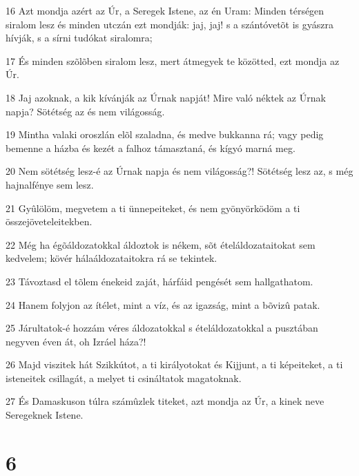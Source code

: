 \par 16 Azt mondja azért az Úr, a Seregek Istene, az én Uram: Minden térségen siralom lesz és minden utczán ezt mondják: jaj, jaj! s a szántóvetõt is gyászra hívják, s a sírni tudókat siralomra;
\par 17 És minden szõlõben siralom lesz, mert átmegyek te közötted, ezt mondja az Úr.
\par 18 Jaj azoknak, a kik kívánják az Úrnak napját! Mire való néktek az Úrnak napja? Sötétség az  és nem világosság.
\par 19 Mintha valaki oroszlán elõl szaladna, és medve bukkanna rá; vagy pedig bemenne a házba és kezét a falhoz támasztaná, és kígyó marná meg.
\par 20 Nem sötétség lesz-é az Úrnak napja és nem világosság?! Sötétség lesz az, s még hajnalfénye sem lesz.
\par 21 Gyûlölöm, megvetem a ti ünnepeiteket, és nem gyönyörködöm a ti összejöveteleitekben.
\par 22 Még ha égõáldozatokkal áldoztok is nékem, sõt ételáldozataitokat sem kedvelem; kövér hálaáldozataitokra rá se tekintek.
\par 23 Távoztasd el tõlem énekeid zaját, hárfáid pengését sem hallgathatom.
\par 24 Hanem folyjon az ítélet, mint a víz, és az igazság, mint a bõvizû patak.
\par 25 Járultatok-é hozzám véres áldozatokkal s ételáldozatokkal a pusztában negyven éven át, oh Izráel háza?!
\par 26 Majd viszitek hát Szikkútot, a ti királyotokat és Kijjunt, a ti képeiteket, a ti isteneitek csillagát, a melyet ti csináltatok magatoknak.
\par 27 És Damaskuson túlra számûzlek titeket, azt mondja az Úr, a kinek neve Seregeknek Istene.

\chapter{6}

